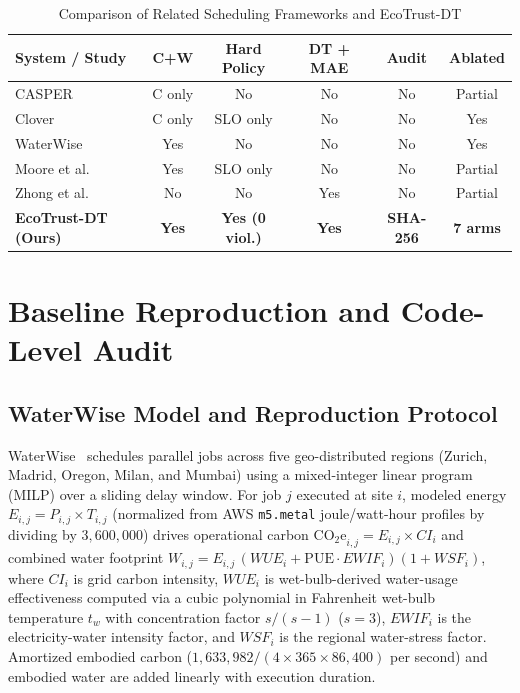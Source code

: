 \documentclass[conference]{IEEEtran}
\begin{document}
\begin{table}[!t]
\caption{Comparison of Related Scheduling Frameworks and EcoTrust-DT}
\label{tab:related_gap}
\centering
\scriptsize
\setlength{\tabcolsep}{3.5pt}
\renewcommand{\arraystretch}{1.15}
\begin{tabular}{@{}lccccc@{}}
\toprule
\textbf{System / Study} & \textbf{C+W} & \textbf{Hard Policy} & \textbf{DT + MAE} & \textbf{Audit} & \textbf{Ablated} \\
\midrule
CASPER~\cite{souza2023casper} & C only & No & No & No & Partial \\
Clover~\cite{li2023clover} & C only & SLO only & No & No & Yes \\
WaterWise~\cite{jiang2025waterwise} & Yes & No & No & No & Yes \\
Moore et al.~\cite{moore2025llm} & Yes & SLO only & No & No & Partial \\
Zhong et al.~\cite{zhong2024dt} & No & No & Yes & No & Partial \\
\textbf{EcoTrust-DT (Ours)} & \textbf{Yes} & \textbf{Yes (0 viol.)} & \textbf{Yes} & \textbf{SHA-256} & \textbf{7 arms} \\
\bottomrule
\end{tabular}
\end{table}

\section{Baseline Reproduction and Code-Level Audit}
\label{sec:baseline}

\subsection{WaterWise Model and Reproduction Protocol}
WaterWise~\cite{jiang2025waterwise} schedules parallel jobs across five geo-distributed regions (Zurich, Madrid, Oregon, Milan, and Mumbai) using a mixed-integer linear program (MILP) over a sliding delay window. For job $j$ executed at site $i$, modeled energy $E_{i,j} = P_{i,j} \times T_{i,j}$ (normalized from AWS \texttt{m5.metal} joule/watt-hour profiles by dividing by $3{,}600{,}000$) drives operational carbon $\mathrm{CO_2e}_{i,j} = E_{i,j} \times CI_i$ and combined water footprint $W_{i,j} = E_{i,j}\,(WUE_i + \mathrm{PUE}\cdot EWIF_i)(1 + WSF_i)$, where $CI_i$ is grid carbon intensity, $WUE_i$ is wet-bulb-derived water-usage effectiveness computed via a cubic polynomial in Fahrenheit wet-bulb temperature $t_w$ with concentration factor $s/(s-1)$ ($s=3$), $EWIF_i$ is the electricity-water intensity factor, and $WSF_i$ is the regional water-stress factor. Amortized embodied carbon ($1{,}633{,}982 / (4 \times 365 \times 86{,}400)$ per second) and embodied water are added linearly with execution duration.
\end{document}
